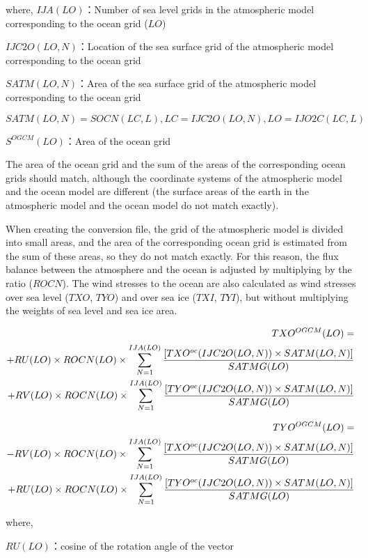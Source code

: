 where, \(IJA(LO)\)：Number of sea level grids in the atmospheric model corresponding to the ocean grid (\(LO\))

\(IJC2O(LO,N)\)：Location of the sea surface grid of the atmospheric model corresponding to the ocean grid

\(SATM(LO,N)\)：Area of the sea surface grid of the atmospheric model corresponding to the ocean grid

\(SATM(LO,N)=SOCN(LC,L),LC=IJC2O(LO,N),LO=IJO2C(LC,L)\)

\(S^{OGCM}(LO)\)：Area of the ocean grid

The area of the ocean grid and the sum of the areas of the corresponding ocean grids should match, although the coordinate systems of the atmospheric model and the ocean model are different (the
surface areas of the earth in the atmospheric model and the ocean model do not match exactly).

When creating the conversion file, the grid of the atmospheric model is divided into small areas, and the area of the corresponding ocean grid is estimated from the sum of these areas, so they do not
match exactly. For this reason, the flux balance between the atmosphere and the ocean is adjusted by multiplying by the ratio (\(ROCN\)). The wind stresses to the ocean are also calculated as wind
stresses over sea level (\(TXO\), \(TYO\)) and over sea ice (\(TXI\), \(TYI\)), but without multiplying the weights of sea level and sea ice area.

\begin{eqnarray} TXO^{OGCM}(LO) =  \notag\\ + RU(LO) \times ROCN(LO) \times \sum_{N=1}^{IJA(LO)} \frac{[TXO^{oc}(IJC2O(LO,N)) \times SATM(LO,N)]}{SATMG(LO)} \notag\\ + RV(LO) \times ROCN(LO) \times \sum_{N=1}^{IJA(LO)}\frac{[TYO^{oc}(IJC2O(LO,N)) \times SATM(LO,N)]}{SATMG(LO)} \end{eqnarray}

\begin{eqnarray} TYO^{OGCM}(LO)= \notag\\ -RV(LO) \times ROCN(LO) \times \sum_{N=1}^{IJA(LO)} \frac{[TXO^{oc}(IJC2O(LO,N)) \times SATM(LO,N)]}{SATMG(LO)} \notag\\ + RU(LO) \times ROCN(LO) \times \sum_{N=1}^{IJA(LO)}\frac{[TYO^{oc}(IJC2O(LO,N)) \times SATM(LO,N)]}{SATMG(LO)} \end{eqnarray}

where,

\(RU(LO)\)：cosine of the rotation angle of the vector

